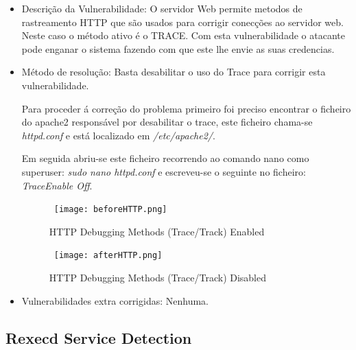 \begin{itemize}
\item Descrição da Vulnerabilidade: O servidor Web permite metodos de rastreamento HTTP que são usados para corrigir conecções ao servidor web.
Neste caso o método ativo é o TRACE. Com esta vulnerabilidade o atacante pode enganar o sistema fazendo com que este lhe envie as suas credencias.

\item Método de resolução: Basta desabilitar o uso do Trace para corrigir esta vulnerabilidade.

\par Para proceder á correção do problema primeiro foi preciso encontrar o ficheiro do apache2 responsável por desabilitar o trace, este ficheiro chama-se \textit{httpd.conf} e está localizado em \textit{/etc/apache2/}.
\par Em seguida abriu-se este ficheiro recorrendo ao comando nano como superuser: \textit{sudo nano httpd.conf} e escreveu-se o seguinte no ficheiro: \textit{TraceEnable Off}.

\begin{figure}[H]

  \centering

  \hbox{\hspace{-6em} \texttt{[image: beforeHTTP.png]}}

  \caption {HTTP Debugging Methods (Trace/Track) Enabled}

  \label {fig3}

\end{figure}
\begin{figure}[H]

  \centering

  \hbox{\hspace{-6em} \texttt{[image: afterHTTP.png]}}

  \caption {HTTP Debugging Methods (Trace/Track) Disabled}

  \label {fig3}

\end{figure}
\item Vulnerabilidades extra corrigidas: Nenhuma.
\end{itemize}

\subsection{Rexecd Service Detection}

